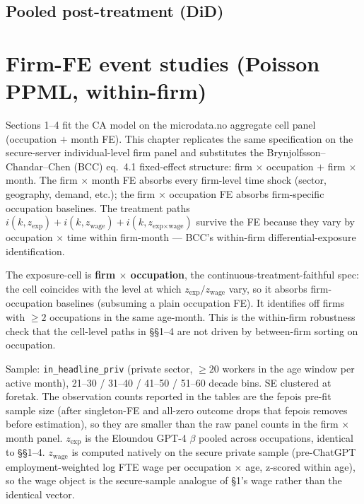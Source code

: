 \documentclass[11pt]{article}
\begin{document}
\clearpage
\subsection{Pooled post-treatment (DiD)}


\clearpage
\section{Firm-FE event studies (Poisson PPML, within-firm)}

\noindent
Sections 1--4 fit the CA model on the microdata.no aggregate cell panel
(occupation $+$ month FE). This chapter replicates the same specification on
the secure-server individual-level firm panel and substitutes the
Brynjolfsson--Chandar--Chen (BCC) eq.\ 4.1 fixed-effect structure: firm
$\times$ occupation $+$ firm $\times$ month. The firm $\times$ month FE
absorbs every firm-level time shock (sector, geography, demand, etc.); the
firm $\times$ occupation FE absorbs firm-specific occupation baselines. The
treatment paths $i(k, z_{\text{exp}}) + i(k, z_{\text{wage}})
+ i(k, z_{\text{exp$\times$wage}})$ survive the FE because they vary by
occupation $\times$ time within firm-month --- BCC's within-firm
differential-exposure identification.
\medskip

\noindent
The exposure-cell is \textbf{firm $\times$ occupation}, the
continuous-treatment-faithful spec: the cell coincides with the level at
which $z_{\text{exp}}/z_{\text{wage}}$ vary, so it absorbs firm-occupation
baselines (subsuming a plain occupation FE). It identifies off firms with
$\geq 2$ occupations in the same age-month. This is the within-firm
robustness check that the cell-level paths in \S\S1--4 are not driven by
between-firm sorting on occupation.
\medskip

\noindent
Sample: \texttt{in\_headline\_priv} (private sector, $\geq 20$ workers in
the age window per active month), 21--30 / 31--40 / 41--50 / 51--60 decade
bins. SE clustered at foretak. The observation counts reported in the
tables are the fepois pre-fit sample size (after singleton-FE and
all-zero outcome drops that fepois removes before estimation), so they
are smaller than the raw panel counts in the firm $\times$ month panel.
$z_{\text{exp}}$ is the Eloundou GPT-4 $\beta$ pooled across occupations,
identical to \S\S1--4. $z_{\text{wage}}$ is computed natively on the
secure private sample (pre-ChatGPT employment-weighted log FTE wage
per occupation $\times$ age, z-scored within age), so the wage object
is the secure-sample analogue of \S1's wage rather than the identical
vector.
\end{document}

